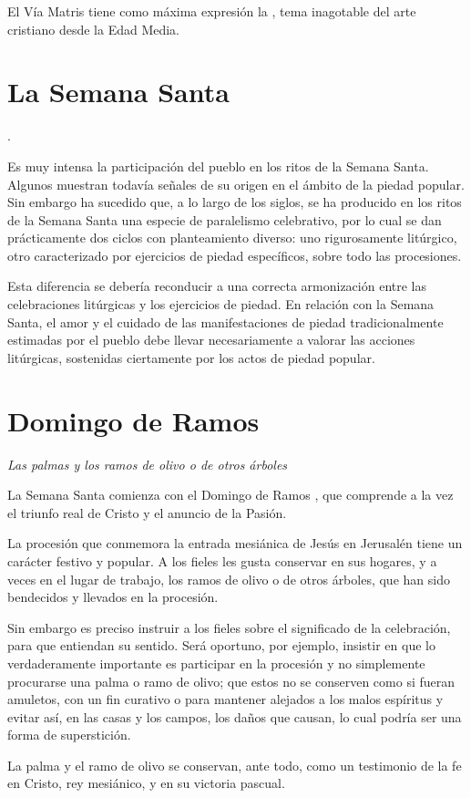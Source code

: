 \begin{introstyle}
El Vía Matris tiene como máxima expresión la , tema inagotable del arte cristiano desde la Edad Media.

\newpage
\section{La Semana Santa}

.

Es muy intensa la participación del pueblo en los ritos de la Semana Santa. Algunos muestran todavía señales de su origen en el ámbito de la piedad popular. Sin embargo ha sucedido que, a lo largo de los siglos, se ha producido en los ritos de la Semana Santa una especie de paralelismo celebrativo, por lo cual se dan prácticamente dos ciclos con planteamiento diverso: uno rigurosamente litúrgico, otro caracterizado por ejercicios de piedad específicos, sobre todo las procesiones.

Esta diferencia se debería reconducir a una correcta armonización entre las celebraciones litúrgicas y los ejercicios de piedad. En relación con la Semana Santa, el amor y el cuidado de las manifestaciones de piedad tradicionalmente estimadas por el pueblo debe llevar necesariamente a valorar las acciones litúrgicas, sostenidas ciertamente por los actos de piedad popular.

\section{Domingo de Ramos}

\textit{Las palmas y los ramos de olivo o de otros árboles}

La Semana Santa comienza con el Domingo de Ramos , que comprende a la vez el triunfo real de Cristo y el anuncio de la Pasión.

La procesión que conmemora la entrada mesiánica de Jesús en Jerusalén tiene un carácter festivo y popular. A los fieles les gusta conservar en sus hogares, y a veces en el lugar de trabajo, los ramos de olivo o de otros árboles, que han sido bendecidos y llevados en la procesión.

Sin embargo es preciso instruir a los fieles sobre el significado de la celebración, para que entiendan su sentido. Será oportuno, por ejemplo, insistir en que lo verdaderamente importante es participar en la procesión y no simplemente procurarse una palma o ramo de olivo; que estos no se conserven como si fueran amuletos, con un fin curativo o para mantener alejados a los malos espíritus y evitar así, en las casas y los campos, los daños que causan, lo cual podría ser una forma de superstición.

La palma y el ramo de olivo se conservan, ante todo, como un testimonio de la fe en Cristo, rey mesiánico, y en su victoria pascual.
\end{introstyle}